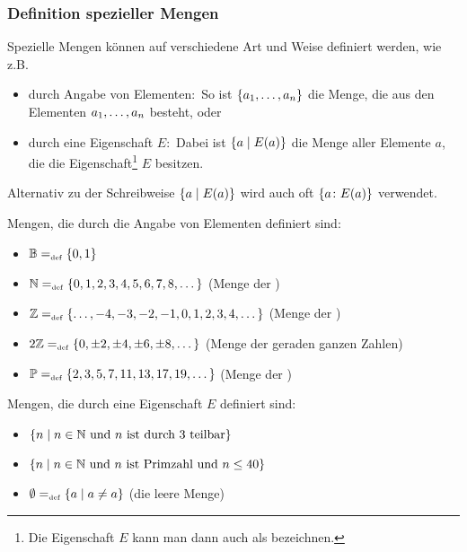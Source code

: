 \subsubsection{Definition spezieller Mengen}
\label{MengenDef}
Spezielle Mengen können auf verschiedene Art und Weise definiert
werden, wie z.B.
\begin{itemize}
%
\item durch Angabe von Elementen:\ So ist $\{{a_{1}}, \allowbreak \dots , \allowbreak{a_{n}}\}$ die Menge,
die aus den Elementen ${a_{1}}, \allowbreak \dots , \allowbreak{a_{n}}$ besteht, oder
%
\item durch eine Eigenschaft $E$:\ Dabei ist $\{a \mid E(a)\}$ die Menge
aller Elemente $a$, die die Eigenschaft\footnote{Die Eigenschaft $E$
kann man dann auch als  bezeichnen.} $E$ besitzen.
%
\end{itemize}
Alternativ zu der Schreibweise $\{a \mid E(a)\}$ wird auch oft 
$\{a \colon E(a)\}$ verwendet.

\goodbreak
\begin{example}
\label{ex:numbers}
Mengen, die durch die Angabe von Elementen definiert sind:
\begin{itemize}
%
\item $\mathbb{B} =_{\mathrm{\scriptscriptstyle def}} \{0,1\}$
%
\item $\mathbb N =_{\mathrm{\scriptscriptstyle def}} \{0, 1, 2, 3, 4, 5, 6, 7, 8, \dots\}$ (Menge der )\index{$\N$}
%
\item $\mathbb Z =_{\mathrm{\scriptscriptstyle def}} \{\dots, -4, -3, -2, -1, 0, 1, 2, 3, 4, \dots\}$ (Menge der )\index{$\Z$}
%
\item $2\mathbb Z =_{\mathrm{\scriptscriptstyle def}} \{0, \pm 2, \pm 4, \pm 6, \pm 8, \dots\}$ (Menge der geraden ganzen Zahlen)\index{$2\Z$}
%
\item $\mathbb{P} =_{\mathrm{\scriptscriptstyle def}} \{2, 3, 5, 7, 11, 13, 17, 19, \dots\}$ (Menge der )\index{$\PRIM$}
%
\end{itemize}
\end{example}

\begin{example}
Mengen, die durch eine Eigenschaft $E$ definiert sind:
\begin{itemize}
%
\item $\{n \mid n \in \mathbb N \text{ und $n$ ist durch $3$ teilbar}\}$
%
\item $\{n \mid n \in \mathbb N \text{ und $n$ ist Primzahl und $n \le 40$}\}$
%
\item $\emptyset =_{\mathrm{\scriptscriptstyle def}} \{a \mid a \not= a\}$ (die leere Menge)\index{$\emptyset$}
%
\end{itemize}
\end{example}

